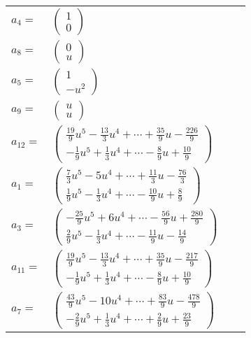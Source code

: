 \documentclass[1p]{elsarticle_modified}
\theoremstyle{definition}
\begin{document}
\begin{tabular}{m{7pt} m{180pt} m{7pt} m{180pt} }
\flushright $a_{4}=$&$\begin{pmatrix}1\\0\end{pmatrix}$ \\
\flushright $a_{8}=$&$\begin{pmatrix}0\\u\end{pmatrix}$ \\
\flushright $a_{5}=$&$\begin{pmatrix}1\\- u^2\end{pmatrix}$ \\
\flushright $a_{9}=$&$\begin{pmatrix}u\\u\end{pmatrix}$ \\
\flushright $a_{12}=$&$\begin{pmatrix}\frac{19}{9} u^5-\frac{13}{3} u^4+\cdots+\frac{35}{9} u-\frac{226}{9}\\-\frac{1}{9} u^5+\frac{1}{3} u^4+\cdots-\frac{8}{9} u+\frac{10}{9}\end{pmatrix}$ \\
\flushright $a_{1}=$&$\begin{pmatrix}\frac{7}{3} u^5-5 u^4+\cdots+\frac{11}{3} u-\frac{76}{3}\\\frac{1}{9} u^5-\frac{1}{3} u^4+\cdots-\frac{10}{9} u+\frac{8}{9}\end{pmatrix}$ \\
\flushright $a_{3}=$&$\begin{pmatrix}-\frac{25}{9} u^5+6 u^4+\cdots-\frac{56}{9} u+\frac{280}{9}\\\frac{2}{9} u^5-\frac{1}{3} u^4+\cdots-\frac{11}{9} u-\frac{14}{9}\end{pmatrix}$ \\
\flushright $a_{11}=$&$\begin{pmatrix}\frac{19}{9} u^5-\frac{13}{3} u^4+\cdots+\frac{35}{9} u-\frac{217}{9}\\-\frac{1}{9} u^5+\frac{1}{3} u^4+\cdots-\frac{8}{9} u+\frac{10}{9}\end{pmatrix}$ \\
\flushright $a_{7}=$&$\begin{pmatrix}\frac{43}{9} u^5-10 u^4+\cdots+\frac{83}{9} u-\frac{478}{9}\\-\frac{2}{9} u^5+\frac{1}{3} u^4+\cdots+\frac{2}{9} u+\frac{23}{9}\end{pmatrix}$ \\

\end{tabular}
\end{document}
